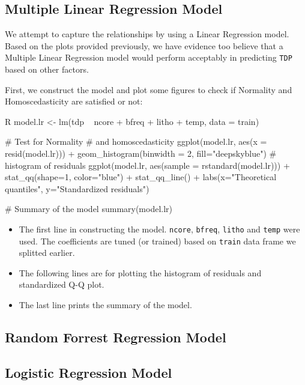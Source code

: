 \subsection{Multiple Linear Regression Model}
\label{section:data_analysis_linear}

We attempt to capture the relationships by using a Linear Regression model. Based on the plots provided previously, 
we have evidence too believe that a Multiple Linear Regression model would perform acceptably in predicting \verb|TDP| based on other factors.

First, we construct the model and plot some figures to check if Normality and Homoscedasticity are satisfied or not:

\begin{code}{R}
model.lr <- lm(tdp ~ ncore + bfreq + litho + temp, data = train) 

# Test for Normality
# and homoscedasticity
ggplot(model.lr, aes(x = resid(model.lr))) +
  geom_histogram(binwidth = 2, fill="deepskyblue") # histogram of residuals
ggplot(model.lr, aes(sample = rstandard(model.lr))) +
  stat_qq(shape=1, color="blue") + stat_qq_line() +
  labs(x="Theoretical quantiles", y="Standardized residuals")

# Summary of the model
summary(model.lr)
\end{code}
\begin{itemize}
    \item The first line in constructing the model. \verb|ncore|, \verb|bfreq|, \verb|litho| and \verb|temp| were used. The coefficients are tuned (or trained) based on \verb|train| 
    data frame we splitted earlier.

    \item The following lines are for plotting the histogram of residuals and standardized Q-Q plot.
    
    \item The last line prints the summary of the model.
\end{itemize}















\subsection{Random Forrest Regression Model}
\label{section:data_analysis_randomforrest}









\subsection{Logistic Regression Model}
\label{section:data_analysis_logistic}